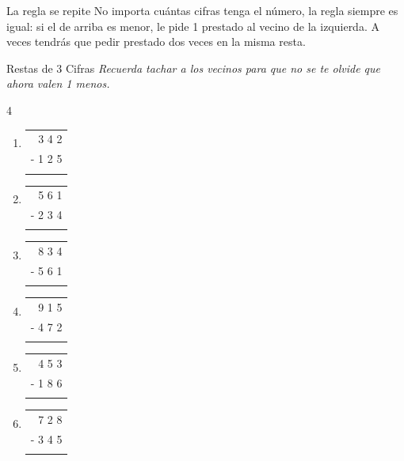 \documentclass[12pt, letterpaper]{article}
\newcommand{\boxfill}[1][1.2cm]{\tcbox[on line, size=minimal, colframe=valdark!80, colback=white, boxrule=0.5pt, arc=1mm, boxsep=2pt, left=2pt, right=2pt, top=2pt, bottom=2pt]{\makebox[#1]{\vphantom{M}}}}
\begin{document}
	\begin{concepto}{La regla se repite}
		No importa cuántas cifras tenga el número, la regla siempre es igual: si el de arriba es menor, le pide 1 prestado al vecino de la izquierda. A veces tendrás que pedir prestado dos veces en la misma resta.
	\end{concepto}
	\newpage
	\begin{practica}{Restas de 3 Cifras }
		\textit{Recuerda tachar a los vecinos para que no se te olvide que ahora valen 1 menos.}
		
		\vspace{0.4cm}
		\begin{multicols}{4}
			\raggedcolumns
			\begin{enumerate}[itemsep=1cm]
				\item 
				\begin{tabular}{r}
					3 4 2 \\
					- 1 2 5 \\
					\hline
					\boxfill[1.5cm]
				\end{tabular}
				
				\item 
				\begin{tabular}{r}
					5 6 1 \\
					- 2 3 4 \\
					\hline
					\boxfill[1.5cm]
				\end{tabular}
				
				\item 
				\begin{tabular}{r}
					8 3 4 \\
					- 5 6 1 \\
					\hline
					\boxfill[1.5cm]
				\end{tabular}
				
				\item 
				\begin{tabular}{r}
					9 1 5 \\
					- 4 7 2 \\
					\hline
					\boxfill[1.5cm]
				\end{tabular}
				
				\item 
				\begin{tabular}{r}
					4 5 3 \\
					- 1 8 6 \\
					\hline
					\boxfill[1.5cm]
				\end{tabular}
				
				\item 
				\begin{tabular}{r}
					7 2 8 \\
					- 3 4 5 \\
					\hline
					\boxfill[1.5cm]
				\end{tabular}
				

\end{enumerate}
\end{multicols}
\end{practica}
\end{document}

